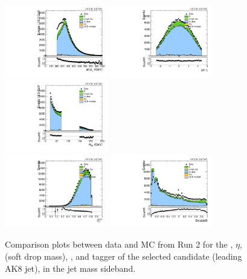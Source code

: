 \begin{figure}[htbp]
  \centering
  \includegraphics[width=0.4\textwidth]{fig/controlPlots/SB_b1_allL_allP_allC_allE_Run2_lnujj_l2_pt.pdf}
  \includegraphics[width=0.4\textwidth]{fig/controlPlots/SB_b1_allL_allP_allC_allE_Run2_lnujj_l2_eta.pdf}\\
  \includegraphics[width=0.4\textwidth]{fig/controlPlots/SB_b1_allL_allP_allC_allE_Run2_mjet.pdf}\\
  \includegraphics[width=0.4\textwidth]{fig/controlPlots/SB_b1_allL_allP_allC_allE_Run2_tau21DDT.pdf}
  \includegraphics[width=0.4\textwidth]{fig/controlPlots/SB_b1_allL_allP_allC_allE_Run2_DoubleB.pdf}\\
  \caption{
    Comparison plots between data and MC from Run 2 for the \pt, $\eta$, \MJ (soft drop mass), \nsubjDDT, and \DoubleB tagger of the selected \Vhad candidate (leading AK8 jet), in the jet mass sideband.
  }
  \label{fig:SB_controlPlotsRun2_3}
\end{figure}

